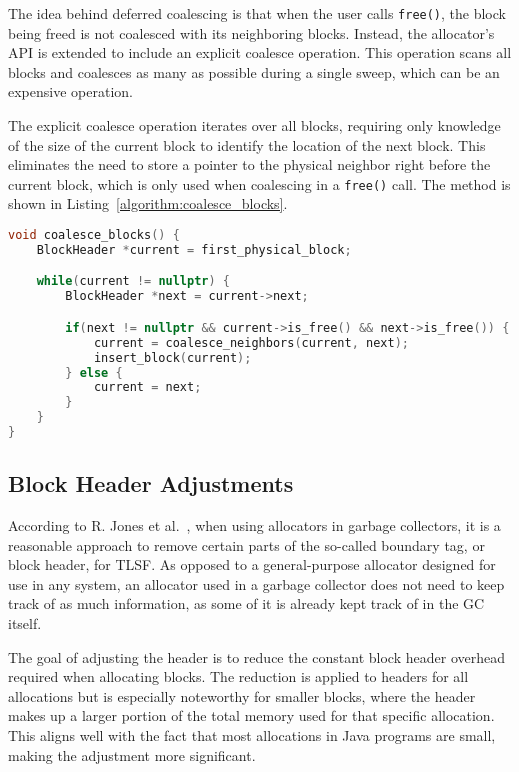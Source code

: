 The idea behind deferred coalescing is that when the user calls \texttt{free()}, the block being freed is not coalesced with its neighboring blocks. Instead, the allocator's API is extended to include an explicit coalesce operation. This operation scans all blocks and coalesces as many as possible during a single sweep, which can be an expensive operation.

The explicit coalesce operation iterates over all blocks, requiring only knowledge of the size of the current block to identify the location of the next block. This eliminates the need to store a pointer to the physical neighbor right before the current block, which is only used when coalescing in a \texttt{free()} call. The method is shown in Listing~\ref{algorithm:coalesce_blocks}.

\begin{lstlisting}[language=C++, caption={Method for explicitly coalescing all possible free blocks in the allocator. Note that coalesce\_neighbors() removes both blocks from the free-list before the newly coalesced block is inserted.}, label={algorithm:coalesce_blocks}]
void coalesce_blocks() {
    BlockHeader *current = first_physical_block;

    while(current != nullptr) {
        BlockHeader *next = current->next;

        if(next != nullptr && current->is_free() && next->is_free()) {
            current = coalesce_neighbors(current, next);
            insert_block(current);
        } else {
            current = next;
        }
    }
}
\end{lstlisting}

\newpage

\subsection{Block Header Adjustments}
\label{sec:adaptations:block-header-adjustments}

According to R. Jones et al.~\cite[Page 103]{gchandbook}, when using allocators in garbage collectors, it is a reasonable approach to remove certain parts of the so-called boundary tag, or block header, for TLSF. As opposed to a general-purpose allocator designed for use in any system, an allocator used in a garbage collector does not need to keep track of as much information, as some of it is already kept track of in the GC itself.

The goal of adjusting the header is to reduce the constant block header overhead required when allocating blocks. The reduction is applied to headers for all allocations but is especially noteworthy for smaller blocks, where the header makes up a larger portion of the total memory used for that specific allocation. This aligns well with the fact that most allocations in Java programs are small, making the adjustment more significant.

